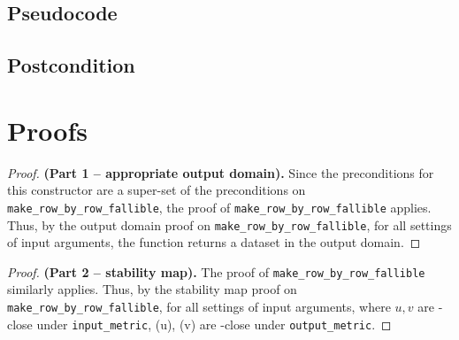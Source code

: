 \documentclass{article}
\begin{document}
\subsection*{Pseudocode}


\subsection*{Postcondition}

\section{Proofs}

\begin{proof} \textbf{(Part 1 -- appropriate output domain).}
    Since the preconditions for this constructor are a super-set of the preconditions on \texttt{make\_row\_by\_row\_fallible}, 
    the proof of \texttt{make\_row\_by\_row\_fallible} applies. 
    Thus, by the output domain proof on \texttt{make\_row\_by\_row\_fallible}, 
    for all settings of input arguments, the function returns a dataset in the output domain.
\end{proof}

\begin{proof} \textbf{(Part 2 -- stability map).} 
    The proof of \texttt{make\_row\_by\_row\_fallible} similarly applies. 
    Thus, by the stability map proof on \texttt{make\_row\_by\_row\_fallible}, 
    for all settings of input arguments, 
    where $u, v$ are \din-close under \texttt{input\_metric},
    \function(u), \function(v) are \dout-close under \texttt{output\_metric}.
\end{proof}
\end{document}
